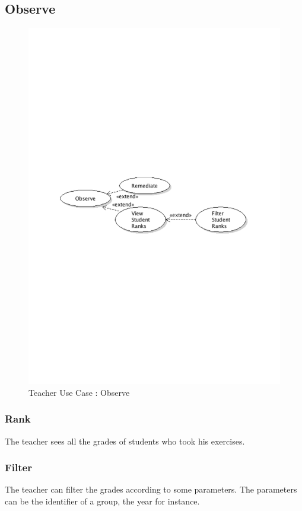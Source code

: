 	\subsection{Observe}
		\begin{figure}[ht]
			\begin{center}
				\includegraphics[width=\textwidth,  trim=2cm 12cm 2cm 12cm]{UML_figure/UC/teacher/UC_Teacher_Observe.pdf}
				\caption{Teacher Use Case : Observe}
			\end{center}
		\end{figure}
		\subsubsection{Rank}
			The teacher sees all the grades of students who took his exercises.
		\subsubsection{Filter}
			The teacher can filter the grades according to some parameters.
			The parameters can be the identifier of a group, the year for instance.
